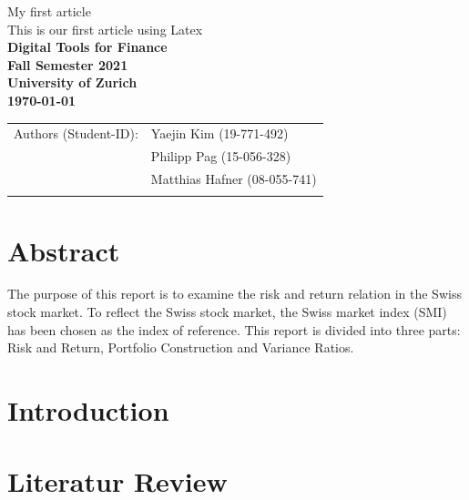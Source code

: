 \documentclass{article}
\begin{document}
\vspace*{3cm}

\begin{center}

\thispagestyle{empty}

{\Huge My first article}\\[0.5cm]
{\LARGE This is our first article using Latex}\\[1.5cm]

{\Large \bf Digital Tools for Finance}\\[1cm]

{\bf \large Fall Semester 2021\\
University of Zurich}\\[1cm]

{\large \bf \today }\\[3cm]


\begin{tabular}{ll}
\hline
{Authors (Student-ID):} & { Yaejin Kim (19-771-492)}\\
& { Philipp Pag (15-056-328)}\\
& { Matthias Hafner (08-055-741) }\\
\hline \\
\end{tabular}



\end{center}


\newpage


\section*{Abstract}
 
The purpose of this report is to examine the risk and return relation in the Swiss stock market. To reflect the Swiss stock market, the Swiss market index (SMI) has been chosen as the index of reference. This report is divided into three parts: Risk and Return, Portfolio Construction and Variance Ratios.

\newpage


\tableofcontents
\newpage

\section{Introduction}
\blindtext
\newpage

\section{Literatur Review}
\end{document}
